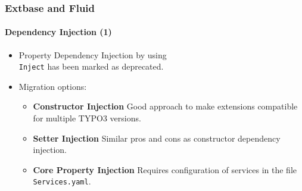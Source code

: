 %

\begin{frame}[fragile]
	\frametitle{Extbase and Fluid}
	\framesubtitle{Dependency Injection (1)}


	\begin{itemize}
		\item Property Dependency Injection by using
			\small\texttt{\@Extbase\\Inject}\normalsize
			has been marked as deprecated.

		\item Migration options:

			\begin{itemize}\small
				\item \textbf{Constructor Injection}\newline
					\smaller
					 	Good approach to make extensions compatible for multiple TYPO3 versions.
					\normalsize
				\item \textbf{Setter Injection}\newline
					\smaller
						Similar pros and cons as constructor dependency injection.
					\normalsize
				\item \textbf{Core Property Injection}\newline
					\smaller
						Requires configuration of services in the file \texttt{Services.yaml}.
					\normalsize
			\end{itemize}\normalsize

	\end{itemize}

\end{frame}

